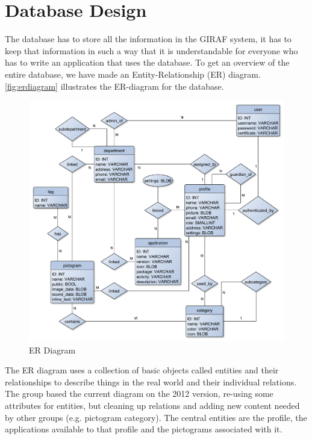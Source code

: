 \section{Database Design}
The database has to store all the information in the GIRAF system, it has to keep that information in such a way that it is understandable for everyone who has to write an application that uses the database.
To get an overview of the entire database, we have made an Entity-Relationship (ER) diagram. \autoref{fig:erdiagram} illustrates the ER-diagram for the database.

\begin{figure}[hptb]
\begin{center}
\includegraphics[width=\textwidth]{img/ER_diagram3.pdf}
\caption{ER Diagram}
\label{fig:erdiagram}
\end{center}
\end{figure}

The ER diagram uses a collection of basic objects called entities and their relationships to describe things in the real world and their individual relations. The group based the current diagram on the 2012 version, re-using some attributes for entities, but cleaning up relations and adding new content needed by other groups (e.g. pictogram category).  The central entities are the profile, the applications available to that profile and the pictograms associated with it. 

